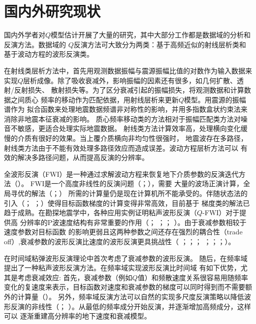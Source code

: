 \vspace{1.2cm}
\section{国内外研究现状}
\vspace{0.4cm}

国内外学者对$Q$模型估计开展了大量的研究，其中大部分工作都是数据域的分析和反演方法。数据域的
$Q$反演方法可大致分为两类：基于高频近似的射线层析类和基于波动方程的波形反演类。

在射线类层析方法中，首先用观测数据振幅与震源振幅比值的对数作为输入数据来
实现$Q$层析成像。除了吸收衰减外，影响振幅的因素还有很多，如几何扩散、透射/反射损失、
散射损失等。为了区分衰减引起的振幅损失，将观测数据和计算数据之间质心
频率的移动作为匹配依据，用射线层析来更新$Q$模型。用震源的振幅谱作为
拟合函数来处理地震数据频谱非对称性的影响，并用多指数盒状约束法来消除非地震本征衰减的影响。
质心频率移动类的方法相对于振幅匹配类方法对噪音不敏感，更适合处理实际地震数据。
射线类方法计算效率高，处理横向变化缓慢的介质有很好的效果。当上覆介质横向非均匀性很强时，
地震波存在多路径，射线类方法由于不能有效处理多路径效应而造成误差。波动方程层析方法可以
有效的解决多路径问题，从而提高反演的分辨率。

全波形反演（FWI）是一种通过求解波动方程来恢复地下介质参数的反演迭代方法（）。
FWI是一个高度非线性的反演问题（；），需要
大量的波场正演计算，全局寻优的解法（；）
所需的计算量仍是现在计算机所不能承受的。伴随状态法的引入（；
；）使得目标函数梯度的计算变得非常高效，目前基于
梯度类的解法已趋于成熟。在勘探地震学中，各种应用实例证明粘声波形反演（$Q$-FWI）对于提供高
分辨率的P波速度结构有非常重要的作用（； 
；； ）。由于衰减参数相较于速度参数对目标函数
的影响更弱且这两种参数之间还存在强烈的耦合性（trade off）,衰减参数的波形反演比速度的波形反演更具挑战性（
；；； 
；；；）。

在时间域粘弹波形反演理论中首次考虑了衰减参数的波形反演。
随后，在频率域提出了一种粘声波形反演方法。在频率域实现波形反演比时间域
有如下优势，尤其是考虑衰减效应: 首先，衰减参数（例如$Q$值）和频散速度关系很容易用随频率
变化的复速度来表示，目标函数对速度和衰减参数的梯度可以同时得到而不需要额外的计算量（）。
另外，频率域反演方法可以自然的实现多尺度反演策略以降低波形反演的非线性（；
）。从最低的频率成分开始反演，并逐渐增加高频成分，这样可以
逐渐重建高分辨率的地下速度和衰减模型。

